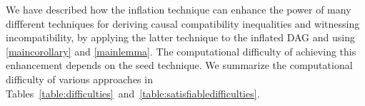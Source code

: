 
We have described how the inflation technique can enhance the power of many diffferent techniques for deriving causal compatibility inequalities and witnessing incompatibility, by applying the latter technique to the inflated DAG and using \cref{maincorollary} and \cref{mainlemma}.  The computational difficulty of achieving this enhancement depends on the seed technique.  We summarize the computational difficulty of various approaches in Tables~\ref{table:difficulties}~and~\ref{table:satisfiabledifficulties}.


